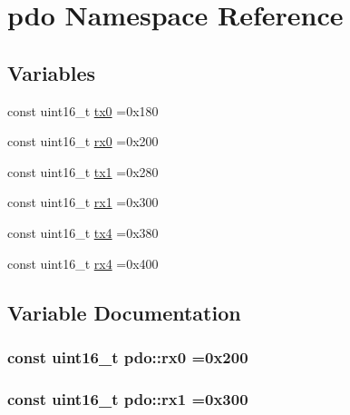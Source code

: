 \hypertarget{namespacepdo}{}\section{pdo Namespace Reference}
\label{namespacepdo}
\subsection*{Variables}
\begin{DoxyCompactItemize}
\item 
const uint16\+\_\+t \hyperlink{namespacepdo_a4a8e678f87bbe2520c5cffe3f6a6dae0}{tx0} =0x180
\item 
const uint16\+\_\+t \hyperlink{namespacepdo_a3a8ecb285207c4eb0b05bc69762404cf}{rx0} =0x200
\item 
const uint16\+\_\+t \hyperlink{namespacepdo_ae5f87d5007685cfd9d219e1cb051ccf0}{tx1} =0x280
\item 
const uint16\+\_\+t \hyperlink{namespacepdo_a1388fefc691ccce0ef2ea8347f737d1d}{rx1} =0x300
\item 
const uint16\+\_\+t \hyperlink{namespacepdo_a12b62b143e83e83b2566dea6d20a169a}{tx4} =0x380
\item 
const uint16\+\_\+t \hyperlink{namespacepdo_ab45e1d027abca75c1d406d514d3f6085}{rx4} =0x400
\end{DoxyCompactItemize}


\subsection{Variable Documentation}
\subsubsection[{\texorpdfstring{rx0}{rx0}}]{\setlength{\rightskip}{0pt plus 5cm}const uint16\+\_\+t pdo\+::rx0 =0x200}\hypertarget{namespacepdo_a3a8ecb285207c4eb0b05bc69762404cf}{}\label{namespacepdo_a3a8ecb285207c4eb0b05bc69762404cf}
\subsubsection[{\texorpdfstring{rx1}{rx1}}]{\setlength{\rightskip}{0pt plus 5cm}const uint16\+\_\+t pdo\+::rx1 =0x300}\hypertarget{namespacepdo_a1388fefc691ccce0ef2ea8347f737d1d}{}\label{namespacepdo_a1388fefc691ccce0ef2ea8347f737d1d}
